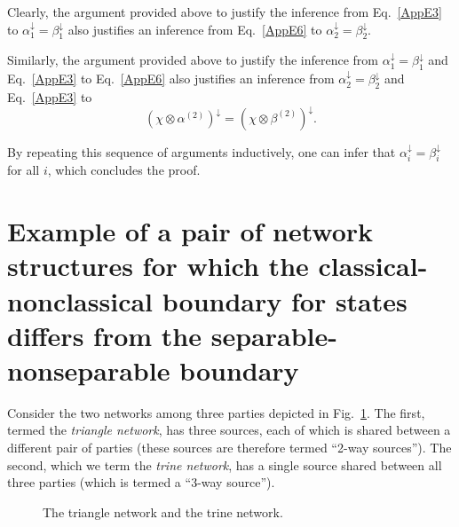 \documentclass[12pt]{article}
\newcommand{\bel}{\color{black}}
\theoremstyle{plain}
\theoremstyle{definition}
\begin{document}
\begin{appendices}
Clearly, the argument provided above to justify the inference from Eq.~\eqref{AppE3} to $\alpha^{\downarrow}_1 =\beta^{\downarrow}_1$ also justifies an inference from Eq.~\eqref{AppE6} to $\alpha^{\downarrow}_2 =\beta^{\downarrow}_2$.

Similarly, the argument provided above to justify the inference from $\alpha^{\downarrow}_1 =\beta^{\downarrow}_1$ and Eq.~\eqref{AppE3} to Eq.~\eqref{AppE6} also justifies an inference from $\alpha^{\downarrow}_2 =\beta^{\downarrow}_2$ and Eq.~\eqref{AppE3} to 
\begin{equation}\label{AppE8}
(\chi \otimes \alpha^{(2)})^{\downarrow}= (\chi \otimes \beta^{(2)})^{\downarrow}.
\end{equation}

By repeating this sequence of arguments inductively, one can infer that $\alpha^{\downarrow}_i =\beta^{\downarrow}_i$ for all $i$, which concludes the proof. 

\section{\sloppy Example of a pair of network structures for which the classical-nonclassical boundary for states differs from the separable-nonseparable boundary}\label{ExamplePairStructures}


Consider the two networks among three parties depicted in Fig.~\ref{fig:trine_and_triangle_networks}. The first, termed the {\em triangle network}, has three %
sources, each of which is shared between a different pair of parties (these sources are therefore termed ``2-way sources'').  The second,
 which we term the {\em  trine network}, 
has a single 
 source shared between all three parties (which is termed a ``3-way source'').  
\begin{figure}[htb]
\centering
    \caption{The triangle network and the trine network.}
    \label{fig:trine_and_triangle_networks}
\end{figure}


\end{appendices}
\end{document}
